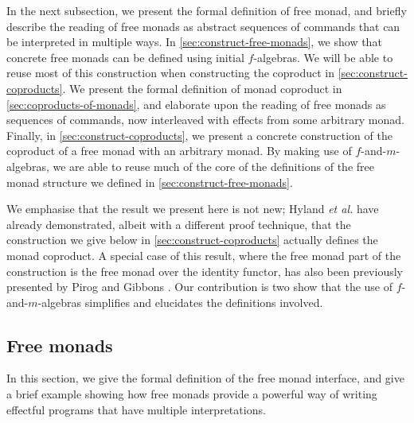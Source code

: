\documentclass{jfp1}
\begin{document}
In the next subsection, we present the formal definition of free
monad, and briefly describe the reading of free monads as abstract
sequences of commands that can be interpreted in multiple ways. In
\autoref{sec:construct-free-monads}, we show that concrete free monads
can be defined using initial $f$-algebras. We will be able to reuse
most of this construction when constructing the coproduct in
\autoref{sec:construct-coproducts}. We present the formal definition of
monad coproduct in \autoref{sec:coproducts-of-monads}, and elaborate
upon the reading of free monads as sequences of commands, now
interleaved with effects from some arbitrary monad. Finally, in
\autoref{sec:construct-coproducts}, we present a concrete construction
of the coproduct of a free monad with an arbitrary monad. By making
use of $f$-and-$m$-algebras, we are able to reuse much of the core of
the definitions of the free monad structure we defined in
\autoref{sec:construct-free-monads}.

We emphasise that the result we present here is not new; Hyland
\emph{et al.} have already demonstrated, albeit with a different proof
technique, that the construction we give below in
\autoref{sec:construct-coproducts} actually defines the monad
coproduct. A special case of this result, where the free monad part of
the construction is the free monad over the identity functor, has also
been previously presented by Pirog and Gibbons
\cite{pirog12tracing}. Our contribution is two show that the use of
$f$-and-$m$-algebras simplifies and elucidates the definitions
involved.

\subsection{Free monads}
\label{sec:free-monads}

In this section, we give the formal definition of the free monad
interface, and give a brief example showing how free monads provide a
powerful way of writing effectful programs that have multiple
interpretations.
\end{document}

